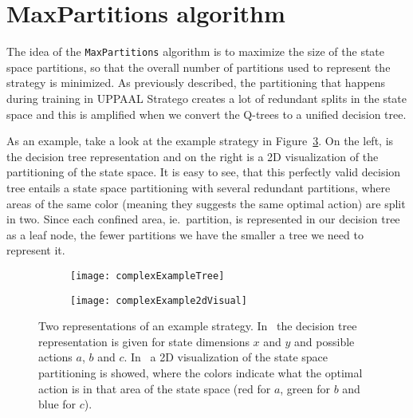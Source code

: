 \section{MaxPartitions algorithm}%
\label{sec:maxParts}

The idea of the \texttt{MaxPartitions} algorithm is to maximize the size of the
state space partitions, so that the overall number of partitions used to
represent the strategy is minimized. As previously described, the partitioning
that happens during training in UPPAAL Stratego creates a lot of redundant
splits in the state space and this is amplified when we convert the Q-trees to a
unified decision tree.

As an example, take a look at the example strategy in
Figure~\ref{fig:complexExample}. On the left, is the decision tree
representation and on the right is a 2D visualization of the partitioning of the
state space. It is easy to see, that this perfectly valid decision tree entails
a state space partitioning with several redundant partitions, where areas of the
same color (meaning they suggests the same optimal action) are split in two.
Since each confined area, ie.\ partition, is represented in our decision tree as
a leaf node, the fewer partitions we have the smaller a tree we need to
represent it.

\begin{figure}[ht]
    \begin{subfigure}[b]{.5\textwidth}
        \centering
        \texttt{[image: complexExampleTree]}
        \subcaption{%
        }\label{fig:complexExampleTree}
    \end{subfigure}
    \begin{subfigure}[b]{.5\textwidth}
        \centering
        \texttt{[image: complexExample2dVisual]}
        \subcaption{%
        }\label{fig:complexExample2dVisual}
    \end{subfigure}%

    \caption{%
        Two representations of an example strategy.
        In~ the decision tree representation is
        given for state dimensions $x$ and $y$ and possible actions $a$, $b$ and
        $c$. In~ a 2D visualization of the
        state space partitioning is showed, where the colors indicate what the
        optimal action is in that area of the state space (red for $a$, green
        for $b$ and blue for $c$).
    }%
    \label{fig:complexExample}
\end{figure}

